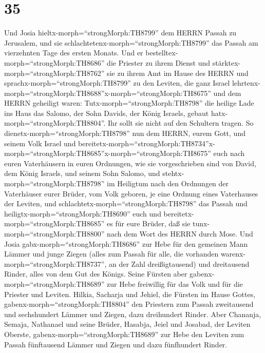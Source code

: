 \hypertarget{section-34}{%
\section{35}\label{section-34}}

 Und Josia hieltx-morph=``strongMorph:TH8799'' dem HERRN
Passah zu Jerusalem, und sie schlachtetenx-morph=``strongMorph:TH8799''
das Passah am vierzehnten Tage des ersten Monats.  Und er
bestelltex-morph=``strongMorph:TH8686'' die Priester zu ihrem Dienst und
stärktex-morph=``strongMorph:TH8762'' sie zu ihrem Amt im Hause des
HERRN  und sprachx-morph=``strongMorph:TH8799'' zu den
Leviten, die ganz Israel
lehrtenx-morph=``strongMorph:TH8688''\textbar x-morph=``strongMorph:TH8675''
und dem HERRN geheiligt waren: Tutx-morph=``strongMorph:TH8798'' die
heilige Lade ins Haus das Salomo, der Sohn Davids, der König Israels,
gebaut hatx-morph=``strongMorph:TH8804''. Ihr sollt sie nicht auf den
Schultern tragen. So dienetx-morph=``strongMorph:TH8798'' nun dem HERRN,
eurem Gott, und seinem Volk Israel  und
bereitetx-morph=``strongMorph:TH8734''x-morph=``strongMorph:TH8685''\textbar x-morph=``strongMorph:TH8675''
euch nach euren Vaterhäusern in euren Ordnungen, wie sie vorgeschrieben
sind von David, dem König Israels, und seinem Sohn Salomo, 
und stehtx-morph=``strongMorph:TH8798'' im Heiligtum nach den Ordnungen
der Vaterhäuser eurer Brüder, vom Volk geboren, je eine Ordnung eines
Vaterhauses der Leviten,  und
schlachtetx-morph=``strongMorph:TH8798'' das Passah und
heiligtx-morph=``strongMorph:TH8690'' euch und
bereitetx-morph=``strongMorph:TH8685'' es für eure Brüder, daß sie
tunx-morph=``strongMorph:TH8800'' nach dem Wort des HERRN durch Mose.
 Und Josia gabx-morph=``strongMorph:TH8686'' zur Hebe für
den gemeinen Mann Lämmer und junge Ziegen (alles zum Passah für alle,
die vorhanden warenx-morph=``strongMorph:TH8737'', an der Zahl
dreißigtausend) und dreitausend Rinder, alles von dem Gut des Königs.
 Seine Fürsten aber gabenx-morph=``strongMorph:TH8689'' zur
Hebe freiwillig für das Volk und für die Priester und Leviten. Hilkia,
Sacharja und Jehiel, die Fürsten im Hause Gottes,
gabenx-morph=``strongMorph:TH8804'' den Priestern zum Passah zweitausend
und sechshundert Lämmer und Ziegen, dazu dreihundert Rinder.
 Aber Chananja, Semaja, Nathanael und seine Brüder, Hasabja,
Jeiel und Josabad, der Leviten Oberste,
gabenx-morph=``strongMorph:TH8689'' zur Hebe den Leviten zum Passah
fünftausend Lämmer und Ziegen und dazu fünfhundert Rinder. 

